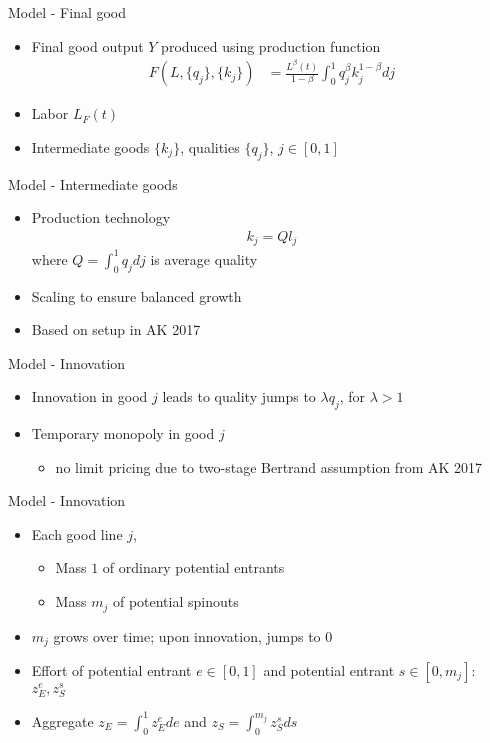 \documentclass[english,usenames,dvipsnames]{beamer}
\begin{document}
\begin{frame}{Model - Final good}
\begin{itemize}
	\item Final good output $Y$ produced using production function
	\begin{align*}
	F(L,\{q_j\},\{k_j\}) &= \frac{L^{\beta}(t)}{1-\beta} \int_0^1 q_j^{\beta} k_j^{1-\beta}  dj 
	\end{align*}
	\item Labor $L_F(t)$
	\item Intermediate goods $\{k_j\}$, qualities $\{q_j\}$, $j \in [0,1]$
\end{itemize}
\end{frame}

\begin{frame}{Model - Intermediate goods}
\begin{itemize}
	\item Production technology
	\begin{align*}
	k_j = Q l_j
	\end{align*}
	where $Q = \int_0^1 q_j dj$ is average quality
	\item Scaling to ensure balanced growth
	\item Based on setup in AK 2017
\end{itemize}
\end{frame}

\begin{frame}{Model - Innovation}
\begin{itemize}
	\item Innovation in good $j$ leads to quality jumps to $\lambda q_j$, for $\lambda > 1$
	\item Temporary monopoly in good $j$
	\begin{itemize}
		\item no limit pricing due to two-stage Bertrand assumption from AK 2017
	\end{itemize}
\end{itemize}
\end{frame}

\begin{frame}{Model - Innovation}
\begin{itemize}
	\item Each good line $j$,
	\begin{itemize}
		\item Mass $1$ of ordinary \alert{potential entrants}
		\item Mass $m_j$ of \alert{potential spinouts} 
	\end{itemize}
	\item $m_j$ grows over time; upon innovation, jumps to $0$
	\item Effort of potential entrant $e \in [0,1]$ and potential entrant $s \in [0,m_j]$: $z_E^e, z_S^s$ 
	\item Aggregate $z_E = \int_0^1 z_E^e de$ and $z_S = \int_0^{m_j} z_S^s ds$ 
\end{itemize}
\end{frame}
\end{document}
